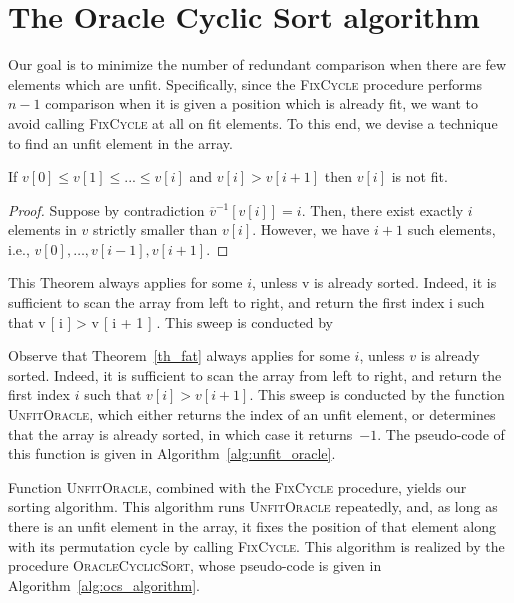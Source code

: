 
\section{The Oracle Cyclic Sort algorithm}

Our goal is to minimize the number of redundant comparison when there are few elements which are unfit.
Specifically, since the \textsc{FixCycle} procedure performs $n-1$ comparison
when it is given a position which is already fit,
we want to avoid calling \textsc{FixCycle} at all on fit elements.
To this end, we devise a technique to find an unfit element in the array.

\begin{thm}
\label{th_fat}
If $v[0] \le v[1] \le ... \le v[i]$ and $v[i] > v[i+1]$ then $v[i]$ is not fit.
\begin{proof}
Suppose by contradiction $\overline{v}^{-1}[v[i]] = i$.
Then, there exist exactly $i$ elements in $v$ strictly smaller than $v[i]$.
However, we have $i+1$ such elements, i.e., $v[0],\dots,v[i-1],v[i+1]$.
\end{proof}
\end{thm}

This Theorem always
applies for some $i$, unless v is already sorted. Indeed,
it is sufficient to scan the array from left
to right, and return the first index i such
that v [ i ] > v [ i + 1 ] . This sweep is conducted by

Observe that Theorem~\ref{th_fat} always applies for some $i$, unless $v$ is already sorted.
Indeed, it is sufficient to scan the array from left to right,
and return the first index $i$ such that $v[i] > v[i+1]$.
This sweep is conducted by the function \textsc{UnfitOracle},
which either returns the index of an unfit element,
or determines that the array is already sorted,
in which case it returns~$-1$.
The pseudo-code of this function is given in Algorithm~\ref{alg:unfit_oracle}.



Function \textsc{UnfitOracle}, combined with the \textsc{FixCycle} procedure, yields our sorting algorithm.
This algorithm runs \textsc{UnfitOracle} repeatedly, and,
as long as there is an unfit element in the array,
it fixes the position of that element along with its permutation cycle
by calling \textsc{FixCycle}.
This algorithm is realized by the procedure \textsc{OracleCyclicSort},
whose pseudo-code is given in Algorithm~\ref{alg:ocs_algorithm}.


